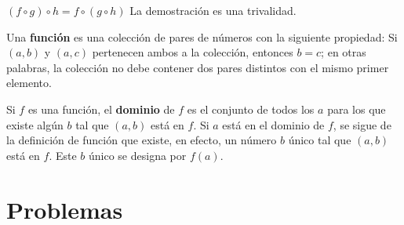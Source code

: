 \begin{tcolorbox}[colframe=white]
    \begin{prop}
    $(f \circ g) \circ h = f \circ (g \circ h)$   La demostración es una trivalidad.
    \end{prop}
\end{tcolorbox}

\begin{tcolorbox}
    \begin{def.} 
	Una \textbf{función} es una colección de pares de números con la siguiente propiedad: Si $(a,b)$ \; y \; $(a,c)$ pertenecen ambos a la colección, entonces $b=c$; en otras palabras, la colección no debe contener dos pares distintos con el mismo primer elemento.\\
    \end{def.}
\end{tcolorbox}

\begin{tcolorbox}
    \begin{def.} 
	Si $f$ es una función, el \textbf{dominio} de $f$ es el conjunto de todos los $a$ para los que existe algún $b$ tal que $(a,b)$ está en $f$. Si $a$ está en el dominio de $f$, se sigue de la definición de función que existe, en efecto, un número $b$ único tal que $(a,b)$ está en $f$. Este $b$ único se designa por $f(a)$.\\  
    \end{def.}
\end{tcolorbox}


\section{Problemas}

